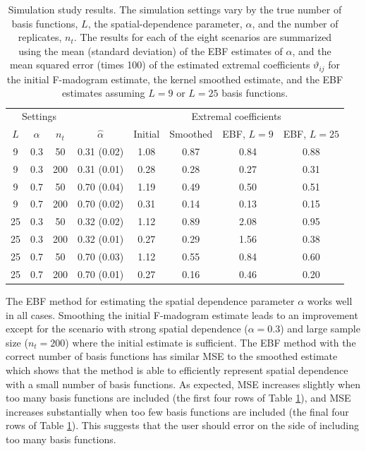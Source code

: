 \documentclass[12pt]{article}
\begin{document}
\begin{table}[t!]
	\caption{Simulation study results.  The simulation settings vary by the true number of basis functions, $L$, the spatial-dependence parameter, $\alpha$, and the number of replicates, $n_t$. The results for each of the eight scenarios are summarized using the mean (standard deviation) of the EBF estimates of $\alpha$, and the mean squared error (times 100) of the estimated extremal coefficients $\vartheta_{ij}$ for the initial F-madogram estimate, the kernel smoothed estimate, and the EBF estimates assuming $L=9$ or $L=25$ basis functions.}
	\label{ebtbl:sims}
	\centering
	\begin{tabular}{ccc|c|cccc}
		\multicolumn{3}{c}{Settings} & & \multicolumn{4}{c}{Extremal coefficients} \\
		$L$ & $\alpha$ & $n_t$ & ${\hat \alpha}$ & Initial 
		& Smoothed & EBF, $L=9$ &EBF, $L=25$\\\hline
 9 &  0.3 &  50 & 0.31 (0.02) & 1.08 & 0.87 & 0.84 & 0.88\\
 9 &  0.3 & 200 & 0.31 (0.01) & 0.28 & 0.28 & 0.27 & 0.31\\
 9 &  0.7 &  50 & 0.70 (0.04) & 1.19 & 0.49 & 0.50 & 0.51\\
 9 &  0.7 & 200 & 0.70 (0.02) & 0.31 & 0.14 & 0.13 & 0.15\\
25 &  0.3 &  50 & 0.32 (0.02) & 1.12 & 0.89 & 2.08 & 0.95\\
25 &  0.3 & 200 & 0.32 (0.01) & 0.27 & 0.29 & 1.56 & 0.38\\
25 &  0.7 &  50 & 0.70 (0.03) & 1.12 & 0.55 & 0.84 & 0.60\\
25 &  0.7 & 200 & 0.70 (0.01) & 0.27 & 0.16 & 0.46 & 0.20
	\end{tabular}
\end{table}


The EBF method for estimating the spatial dependence parameter $\alpha$ works well in all cases.  Smoothing the initial F-madogram estimate leads to an improvement except for the scenario with strong spatial dependence ($\alpha=0.3$) and large sample size ($n_t=200$) where the initial estimate is sufficient. The EBF method with the correct number of basis functions has similar MSE to the smoothed estimate which shows that the method is able to efficiently represent spatial dependence with a small number of basis functions.  As expected, MSE increases slightly when too many basis functions are included (the first four rows of Table \ref{ebtbl:sims}), and MSE increases substantially when too few basis functions are included (the final four rows of Table \ref{ebtbl:sims}).  This suggests that the user should error on the side of including too many basis functions.  
\end{document}
